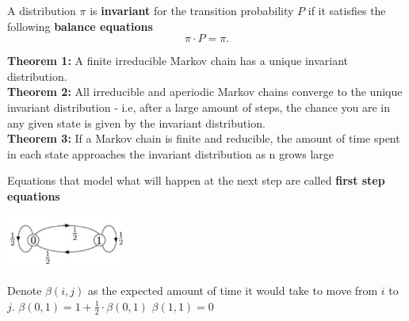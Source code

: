 {\begin{minipage}{16.3cm}
\vspace{.5cm}

A distribution $\pi$ is \textbf{invariant} for the transition probability $P$ if it satisfies the following \textbf{balance equations}
\[\pi \cdot P = \pi.\]

\textbf{Theorem 1: }A finite irreducible Markov chain has a unique 
invariant distribution.\\
\textbf{Theorem 2: }All irreducible and aperiodic Markov chains 
converge to the unique invariant distribution - i.e, after a large amount of steps, the chance you are in any given
state is given by the invariant distribution. \\
\textbf{Theorem 3: }If a Markov chain is  finite and reducible, the amount of time spent in each state approaches the invariant distribution as n grows large

Equations that model what will happen at the next step are called 
\textbf{first step equations}

\vspace{.5cm}

\begin{minipage}[b]{0.6\linewidth}
\begin{center}
\includegraphics[width=4cm]{definitions_markov_chain.jpg} 
\end{center}
\end{minipage}%
\hfill
\begin{minipage}[b]{0.4\linewidth}
Denote $\beta(i, j)$ as the expected amount of time it would take to 
move from $i$ to $j$.
$\beta(0, 1) = 1 + \frac{1}{2} \cdot \beta(0, 1)$
$\beta(1, 1) = 0$

\end{minipage}

\end{minipage}}